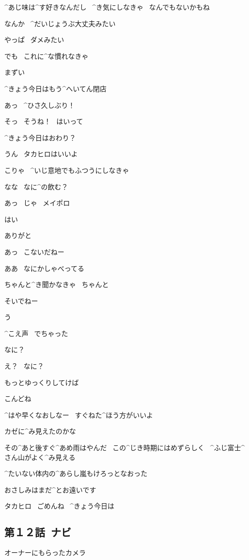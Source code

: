 \A ^{あじ}{味}は^{す}{好}きなんだし
\ ^{き}{気}にしなきゃ
\ なんでもないかもね

\page
\A なんか
\ ^{だいじょうぶ}{大丈夫}みたい

\page
\A やっぱ
\ ダメみたい

\A でも
\ これに^{な}{慣}れなきゃ

\A まずい

\A ^{きょう}{今日}はもう^{へいてん}{閉店}

\page
\T あっ
\ ^{ひさ}{久}しぶり！

\A そっ
\ そうね！
\ はいって

\T ^{きょう}{今日}はおわり？

\A うん
\ タカヒロはいいよ

\page
\A こりゃ
\ ^{いじ}{意地}でもふつうにしなきゃ

\A なな
\ なに^{の}{飲}む？

\T あっ
\ じゃ
\ メイポロ

\A はい

\T ありがと

\page
\T あっ
\ こないだねー

\A ああ
\ なにかしゃべってる

\A ちゃんと^{き}{聞}かなきゃ
\ ちゃんと

\page
\T そいでねー

\A う

\A ^{こえ}{声}
\ でちゃった

\T なに？

\A え？
\ なに？

\page
\A もっとゆっくりしてけば

\T こんどね

\T ^{はや}{早}くなおしなー
\ すぐねた^{ほう}{方}がいいよ

\A カゼに^{み}{見}えたのかな

\page
\A その^{あと}{後}すぐ^{あめ}{雨}はやんだ
\ この^{じき}{時期}にはめずらしく
\ ^{ふじ}{富士}^{さん}{山}がよく^{み}{見}える

\A ^{たいない}{体内}の^{あらし}{嵐}もけろっとなおった

\page
\A おさしみはまだ^{とお}{遠}いです

\A タカヒロ
\ ごめんね
\ ^{きょう}{今日}は


\subsection{第１２話\ ナビ}

\page[68]
\A オーナーにもらったカメラ

